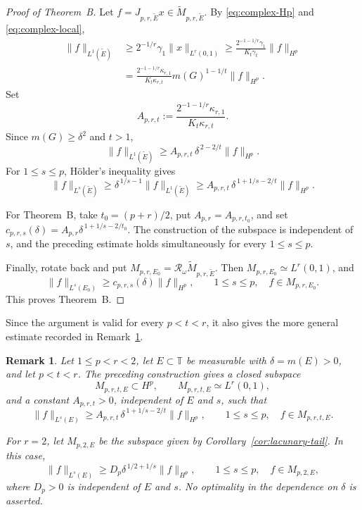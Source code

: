 \documentclass[10pt,a4paper]{amsart}
\newtheorem{remark}[theorem]{Remark}
\newcommand{\T}{\mathbb{T}}
\begin{document}
\begin{proof}[Proof of Theorem~B]
Let \(f=J_{p,r,\widetilde E}x\in
\widetilde M_{p,r,\widetilde E}\).  By
\eqref{eq:complex-Hp} and
\eqref{eq:complex-local},
\[
\begin{aligned}
        \|f\|_{L^1(\widetilde E)}
        &\ge
        2^{-1/r}\gamma_1\|x\|_{L^r(0,1)}\ge
        \frac{2^{-1-1/r}\gamma_1}
             {K_t\gamma_t}
        \|f\|_{H^p}\\
        &=
        \frac{2^{-1-1/r}\kappa_{r,1}}
             {K_t\kappa_{r,t}}
        m(G)^{1-1/t}\|f\|_{H^p}.
\end{aligned}
\]
Set
\[
        A_{p,r,t}
        :=
        \frac{2^{-1-1/r}\kappa_{r,1}}
             {K_t\kappa_{r,t}}.
\]
Since \(m(G)\ge\delta^2\) and \(t>1\),
\[
        \|f\|_{L^1(\widetilde E)}
        \ge
        A_{p,r,t}\,\delta^{\,2-2/t}\|f\|_{H^p}.
\]
For \(1\le s\le p\), H\"older's inequality gives
\[
        \|f\|_{L^s(\widetilde E)}
        \ge
        \delta^{\,1/s-1}\|f\|_{L^1(\widetilde E)}  \ge
        A_{p,r,t}\,
        \delta^{\,1+1/s-2/t}\|f\|_{H^p}.
\]

For Theorem~B, take \(t_0=(p+r)/2\), put
\(A_{p,r}=A_{p,r,t_0}\), and set
\(c_{p,r,s}(\delta)
=A_{p,r}\delta^{\,1+1/s-2/t_0}\).
The construction of the subspace is independent of \(s\), and the
preceding estimate holds simultaneously for every \(1\le s\le p\).

Finally, rotate back and put
\(M_{p,r,E_0}
=\mathcal R_\omega\widetilde M_{p,r,\widetilde E}\).
Then \(M_{p,r,E_0}\simeq L^r(0,1)\), and
\[
        \|f\|_{L^s(E_0)}
        \ge
        c_{p,r,s}(\delta)\|f\|_{H^p},
        \qquad
        1\le s\le p,\quad
        f\in M_{p,r,E_0}.
\]
This proves Theorem~B.
\end{proof}


 Since the argument is valid for every
\(p<t<r\), it also gives the more general estimate recorded in
Remark~\ref{rem:local-bound}.


\begin{remark}
\label{rem:local-bound}
Let \(1\le p<r<2\), let \(E\subset\T\) be measurable with
\(\delta=m(E)>0\), and let \(p<t<r\).  The preceding construction
gives a closed subspace
\[
        M_{p,r,t,E}\subset H^p,
        \qquad
        M_{p,r,t,E}\simeq L^r(0,1),
\]
and a constant \(A_{p,r,t}>0\), independent of \(E\) and \(s\), such
that
\[
        \|f\|_{L^s(E)}
        \ge
        A_{p,r,t}\,
        \delta^{\,1+1/s-2/t}
        \|f\|_{H^p},
        \qquad
        1\le s\le p,\quad f\in M_{p,r,t,E}.
\]

For \(r=2\), let \(M_{p,2,E}\) be the subspace given by
Corollary~\ref{cor:lacunary-tail}.  In this case,
\[
        \|f\|_{L^s(E)}
        \ge
        D_p\delta^{\,1/2+1/s}\|f\|_{H^p},
        \qquad
        1\le s\le p,\quad f\in M_{p,2,E},
\]
where \(D_p>0\) is independent of \(E\) and \(s\).  No optimality in the dependence on \(\delta\) is asserted.
\end{remark}
\end{document}
